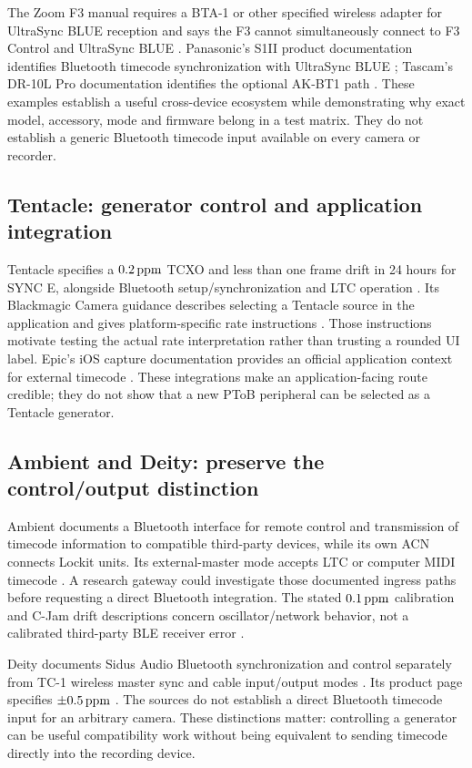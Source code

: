 \documentclass[11pt,letterpaper]{article}
\begin{document}
The Zoom F3 manual requires a BTA-1 or other specified wireless adapter for UltraSync BLUE reception and says the F3 cannot simultaneously connect to F3 Control and UltraSync BLUE \cite{zoom}. Panasonic's S1II product documentation identifies Bluetooth timecode synchronization with UltraSync BLUE \cite{panasonic}; Tascam's DR-10L Pro documentation identifies the optional AK-BT1 path \cite{tascam}. These examples establish a useful cross-device ecosystem while demonstrating why exact model, accessory, mode and firmware belong in a test matrix. They do not establish a generic Bluetooth timecode input available on every camera or recorder.

\subsection{Tentacle: generator control and application integration}
Tentacle specifies a $0.2\,\mathrm{ppm}$ TCXO and less than one frame drift in 24 hours for SYNC E, alongside Bluetooth setup/synchronization and LTC operation \cite{tentacle}. Its Blackmagic Camera guidance describes selecting a Tentacle source in the application and gives platform-specific rate instructions \cite{blackmagic}. Those instructions motivate testing the actual rate interpretation rather than trusting a rounded UI label. Epic's iOS capture documentation provides an official application context for external timecode \cite{epic}. These integrations make an application-facing route credible; they do not show that a new PToB peripheral can be selected as a Tentacle generator.

\subsection{Ambient and Deity: preserve the control/output distinction}
Ambient documents a Bluetooth interface for remote control and transmission of timecode information to compatible third-party devices, while its own ACN connects Lockit units. Its external-master mode accepts LTC or computer MIDI timecode \cite{ambient}. A research gateway could investigate those documented ingress paths before requesting a direct Bluetooth integration. The stated $0.1\,\mathrm{ppm}$ calibration and C-Jam drift descriptions concern oscillator/network behavior, not a calibrated third-party BLE receiver error \cite{ambientaccuracy}.

Deity documents Sidus Audio Bluetooth synchronization and control separately from TC-1 wireless master sync and cable input/output modes \cite{deityguide}. Its product page specifies $\pm0.5\,\mathrm{ppm}$ \cite{deity}. The sources do not establish a direct Bluetooth timecode input for an arbitrary camera. These distinctions matter: controlling a generator can be useful compatibility work without being equivalent to sending timecode directly into the recording device.
\end{document}
